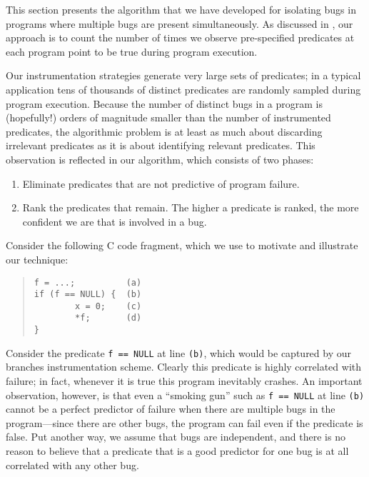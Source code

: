 This section presents the algorithm that we have developed for
isolating bugs in programs where multiple bugs are present
simultaneously.  As discussed in , our
approach is to count the number of times we observe pre-specified
predicates at each program point to be true during program
execution.

Our instrumentation strategies generate very large sets
of predicates; in a typical application tens of thousands of distinct
predicates are randomly sampled during program execution.  Because the
number of distinct bugs in a program is (hopefully!) orders of
magnitude smaller than the number of instrumented predicates, the
algorithmic problem is at least as much about discarding irrelevant
predicates as it is about identifying relevant predicates.  This
observation is reflected in our algorithm, which consists of two phases:
\begin{enumerate}
\item Eliminate predicates that are not predictive of program failure.

\item Rank the predicates that remain.  The higher a predicate is ranked,
the more confident we are that is involved in a bug.
\end{enumerate}

Consider the following C code fragment, which we use to motivate and illustrate
our technique:
\begin{quote}
\begin{verbatim}
f = ...;          (a)
if (f == NULL) {  (b)
        x = 0;    (c)
        *f;       (d)
}
\end{verbatim}
\end{quote}
Consider the predicate {\tt f == NULL} at line {\tt (b)}, which would
be captured by our branches instrumentation scheme.  Clearly
this predicate is highly correlated with failure; in fact, whenever it
is true this program inevitably crashes.  An important observation,
however, is that even a ``smoking gun'' such as {\tt f == NULL} at
line {\tt (b)} cannot be a perfect predictor of failure when there are
multiple bugs in the program---since there are other bugs, the program can fail
even if the predicate is false.  Put another way, we assume
that bugs are independent, and there is no reason to believe that
a predicate that is a good predictor for one bug is at all correlated
with any other bug.

